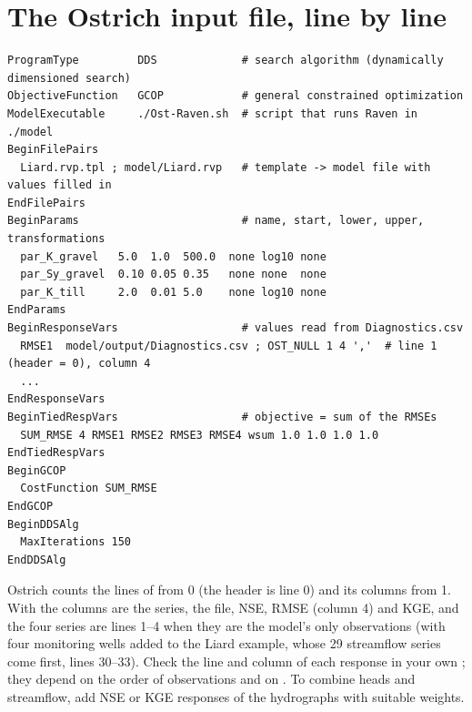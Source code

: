 \section{The Ostrich input file, line by line}
\begin{lstlisting}
ProgramType         DDS             # search algorithm (dynamically dimensioned search)
ObjectiveFunction   GCOP            # general constrained optimization
ModelExecutable     ./Ost-Raven.sh  # script that runs Raven in ./model
BeginFilePairs
  Liard.rvp.tpl ; model/Liard.rvp   # template -> model file with values filled in
EndFilePairs
BeginParams                         # name, start, lower, upper, transformations
  par_K_gravel   5.0  1.0  500.0  none log10 none
  par_Sy_gravel  0.10 0.05 0.35   none none  none
  par_K_till     2.0  0.01 5.0    none log10 none
EndParams
BeginResponseVars                   # values read from Diagnostics.csv
  RMSE1  model/output/Diagnostics.csv ; OST_NULL 1 4 ','  # line 1 (header = 0), column 4
  ...
EndResponseVars
BeginTiedRespVars                   # objective = sum of the RMSEs
  SUM_RMSE 4 RMSE1 RMSE2 RMSE3 RMSE4 wsum 1.0 1.0 1.0 1.0
EndTiedRespVars
BeginGCOP
  CostFunction SUM_RMSE
EndGCOP
BeginDDSAlg
  MaxIterations 150
EndDDSAlg
\end{lstlisting}
Ostrich counts the lines of  from 0 (the header is line 0) and its columns from 1. With
 the columns are the series, the file, NSE, RMSE (column 4) and
KGE, and the four  series are lines 1--4 when they are the model's only observations (with four monitoring
wells added to the Liard example, whose 29 streamflow series come first, lines 30--33). Check the line and column of each response in your own
; they depend on the order of observations and on . To combine heads and streamflow, add NSE or KGE responses of the hydrographs with suitable weights.

